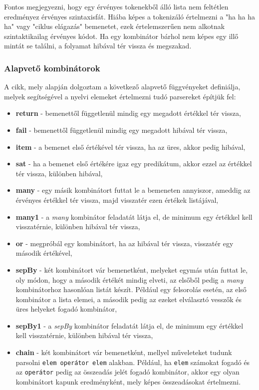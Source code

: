 Fontos megjegyezni, hogy egy érvényes tokenekből álló lista nem feltétlen eredményez érvényes szintaxisfát. Hiába képes a tokenizáló értelmezni a "ha ha ha ha" vagy "ciklus elágazás" bemenetet, ezek értelemszerűen nem alkotnak szintaktikailag érvényes kódot. Ha egy kombinátor bárhol nem képes egy illő mintát se találni, a folyamat hibával tér vissza és megszakad.

\subsubsection{Alapvető kombinátorok}

A cikk, mely alapján dolgoztam a következő alapvető függvényeket definiálja, melyek segítségével a nyelvi elemeket értelmezni tudó parsereket építjük fel:

\begin{itemize}
    \item \textbf{return} - bemenettől függetlenül mindig egy megadott értékkel tér vissza,
    \item \textbf{fail} - bemenettől függetlenül mindig egy megadott hibával tér vissza,
    \item \textbf{item} - a bemenet első értékével tér vissza, ha az üres, akkor pedig hibával,
    \item \textbf{sat} - ha a bemenet első értékére igaz egy predikátum, akkor ezzel az értékkel tér vissza, különben hibával,
    \item \textbf{many} - egy másik kombinátort futtat le a bemeneten annyiszor, ameddig az érvényes értékkel tér vissza, majd visszatér ezen értékek listájával,
    \item \textbf{many1} - a \textit{many} kombinátor feladatát látja el, de minimum egy értékkel kell visszatérnie, különben hibával tér vissza,
    \item \textbf{or} - megpróbál egy kombinátort, ha az hibával tér vissza, visszatér egy második értékével,
    \item \textbf{sepBy} - két kombinátort vár bemenetként, melyeket egymás után futtat le, oly módon, hogy a második értékét mindig elveti, az elsőből pedig a \textit{many} kombinátorhoz hasonlóan listát készít. Például egy felsorolás esetén, az első kombinátor a lista elemei, a második pedig az ezeket elválasztó vesszők és üres helyeket fogadó kombinátor,
    \item \textbf{sepBy1} - a \textit{sepBy} kombinátor feladatát látja el, de minimum egy értékkel kell visszatérnie, különben hibával tér vissza,
    \item \textbf{chain} - két kombinátort vár bemenetként, mellyel műveleteket tudunk parsolni \texttt{elem operátor elem} alakban. Például, ha \texttt{elem} számokat fogadó és az \linebreak\texttt{operátor} pedig az összeadás jelét fogadó kombinátor, akkor egy olyan kombinátort kapunk eredményként, mely képes összeadásokat értelmezni.
    

\end{itemize}
